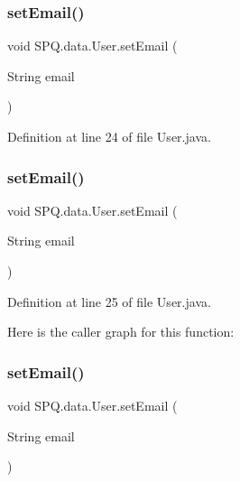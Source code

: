 \subsubsection{\texorpdfstring{set\+Email()}{setEmail()}\hspace{0.1cm}{\footnotesize\ttfamily [1/4]}}
{\footnotesize\ttfamily void S\+P\+Q.\+data.\+User.\+set\+Email (\begin{DoxyParamCaption}\item[{String}]{email }\end{DoxyParamCaption})}



Definition at line 24 of file User.\+java.

\mbox{\label{class_s_p_q_1_1data_1_1_user_ab7132f971882fb88afc6999cf5473ef4}} 
\subsubsection{\texorpdfstring{set\+Email()}{setEmail()}\hspace{0.1cm}{\footnotesize\ttfamily [2/4]}}
{\footnotesize\ttfamily void S\+P\+Q.\+data.\+User.\+set\+Email (\begin{DoxyParamCaption}\item[{String}]{email }\end{DoxyParamCaption})}



Definition at line 25 of file User.\+java.

Here is the caller graph for this function\+:
\mbox{\label{class_s_p_q_1_1data_1_1_user_ab7132f971882fb88afc6999cf5473ef4}} 
\subsubsection{\texorpdfstring{set\+Email()}{setEmail()}\hspace{0.1cm}{\footnotesize\ttfamily [3/4]}}
{\footnotesize\ttfamily void S\+P\+Q.\+data.\+User.\+set\+Email (\begin{DoxyParamCaption}\item[{String}]{email }\end{DoxyParamCaption})}



